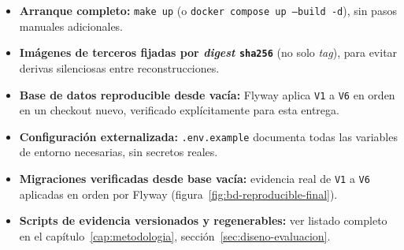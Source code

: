 \begin{itemize}[nosep]
  \item \textbf{Arranque completo:} \texttt{make up} (o \texttt{docker
    compose up --build -d}), sin pasos manuales adicionales.
  \item \textbf{Im\'agenes de terceros fijadas por \emph{digest}
    \texttt{sha256}} (no solo \emph{tag}), para evitar derivas silenciosas
    entre reconstrucciones.
  \item \textbf{Base de datos reproducible desde vac\'ia:} Flyway aplica
    \texttt{V1} a \texttt{V6} en orden en un checkout nuevo, verificado
    expl\'icitamente para esta entrega.
  \item \textbf{Configuraci\'on externalizada:} \texttt{.env.example}
    documenta todas las variables de entorno necesarias, sin secretos
    reales.
  \item \textbf{Migraciones verificadas desde base vac\'ia:} evidencia real
    de \texttt{V1} a \texttt{V6} aplicadas en orden por Flyway
    (figura~\ref{fig:bd-reproducible-final}).
  \item \textbf{Scripts de evidencia versionados y regenerables:} ver
    listado completo en el cap\'itulo~\ref{cap:metodologia},
    secci\'on~\ref{sec:diseno-evaluacion}.
\end{itemize}
